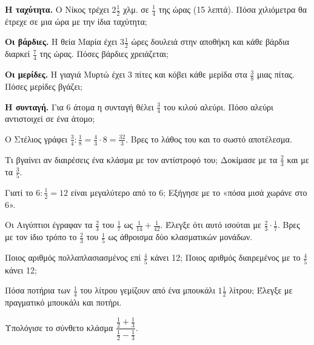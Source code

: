 \ex \textbf{Η ταχύτητα.} Ο Νίκος τρέχει $2\frac{1}{2}$ χλμ. σε $\frac{1}{4}$ της ώρας (15 λεπτά). Πόσα χιλιόμετρα θα έτρεχε σε μια ώρα με την ίδια ταχύτητα;

\ex \textbf{Οι βάρδιες.} Η θεία Μαρία έχει $3\frac{1}{2}$ ώρες δουλειά στην αποθήκη και κάθε βάρδια διαρκεί $\frac{7}{4}$ της ώρας. Πόσες βάρδιες χρειάζεται;

\ex \textbf{Οι μερίδες.} Η γιαγιά Μυρτώ έχει 3 πίτες και κόβει κάθε μερίδα στα $\frac{3}{8}$ μιας πίτας. Πόσες μερίδες βγάζει;

\ex \textbf{Η συνταγή.} Για 6 άτομα η συνταγή θέλει $\frac{3}{4}$ του κιλού αλεύρι. Πόσο αλεύρι αντιστοιχεί σε ένα άτομο;


\ex Ο Στέλιος γράφει $\frac{3}{4}:\frac{1}{8}=\frac{4}{3}\cdot 8=\frac{32}{3}$. Βρες το λάθος του και το σωστό αποτέλεσμα.

\ex Τι βγαίνει αν διαιρέσεις ένα κλάσμα με τον αντίστροφό του; Δοκίμασε με τα $\frac{2}{3}$ και με τα $\frac{3}{5}$.

\ex Γιατί το $6:\frac{1}{2}=12$ είναι μεγαλύτερο από το 6; Εξήγησε με το «πόσα μισά χωράνε στο 6».

\ex Οι Αιγύπτιοι έγραφαν τα $\frac{2}{3}$ του $\frac{1}{7}$ ως $\frac{1}{14}+\frac{1}{42}$. Έλεγξε ότι αυτό ισούται με $\frac{2}{3}\cdot\frac{1}{7}$. Βρες με τον ίδιο τρόπο το $\frac{2}{3}$ του $\frac{1}{5}$ ως άθροισμα δύο κλασματικών μονάδων.

\ex Ποιος αριθμός πολλαπλασιασμένος επί $\frac{4}{5}$ κάνει 12; Ποιος αριθμός διαιρεμένος με το $\frac{4}{5}$ κάνει 12;


\ex Πόσα ποτήρια των $\frac{1}{4}$ του λίτρου γεμίζουν από ένα μπουκάλι $1\frac{1}{2}$ λίτρου; Έλεγξε με πραγματικό μπουκάλι και ποτήρι.

\ex Υπολόγισε το σύνθετο κλάσμα $\dfrac{\frac{1}{2}+\frac{1}{3}}{\frac{1}{2}-\frac{1}{3}}$.
